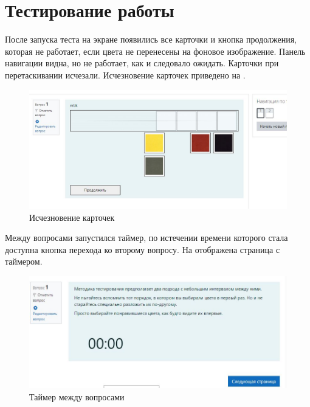 \section{Тестирование работы} \label{ch4:sec2}

После запуска теста на экране появились все карточки и кнопка продолжения, которая не работает, если цвета не перенесены на фоновое изображение. Панель навигации видна, но не работает, как и следовало ожидать. Карточки при перетаскивании исчезали. Исчезновение карточек приведено на .

\FloatBarrier %
\begin{figure}[ht] 
	\center
	\includegraphics [scale=0.5] {my_folder/images/test1}
	\caption{Исчезновение карточек} 
	\label{fig:test1}  
\end{figure}
\FloatBarrier %

Между вопросами запустился таймер, по истечении времени которого стала доступна кнопка перехода ко второму вопросу. На  отображена страница с таймером.
\FloatBarrier %
\begin{figure}[ht] 
	\center
	\includegraphics [scale=0.7] {my_folder/images/between}
	\caption{Таймер между вопросами} 
	\label{fig:time}  
\end{figure}
\FloatBarrier %

